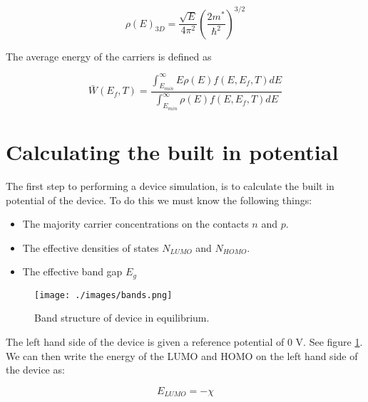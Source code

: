\begin{equation}
\rho(E)_{3D}=\frac{\sqrt{E}}{4\pi^2} \left ( \frac{2m^{*}}{\hbar^2}\right )^{3/2}
\end{equation}

The average energy of the carriers is defined as

\begin{equation}
\label{eq:energy}
\bar{W}(E_{f},T)=\frac{\int^{\infty}_{E_{min}} E \rho(E) f(E,E_{f},T) dE}{\int^{\infty}_{E_{min}} \rho(E) f(E,E_{f},T) dE}
\end{equation}












\section{Calculating the built in potential}  \label{sssec:initial}
The first step to performing a device simulation, is to calculate the built in potential of the device.  To do this we must know the following things:

\begin{itemize}

  \item The majority carrier concentrations on the contacts $n$ and $p$.
  \item The effective densities of states $N_{LUMO}$ and $N_{HOMO}$.
  \item The effective band gap $E_g$

\end{itemize}

\begin{figure}[H]
\centering
\texttt{[image: ./images/bands.png]}
\caption{Band structure of device in equilibrium.}
\label{fig:bands}
\end{figure}

\vspace{1em}
The left hand side of the device is given a reference potential of 0 V.  See figure \ref{fig:bands}.  We can then write the energy of the LUMO and HOMO on the left hand side of the device as:

\begin{equation}
E_{LUMO}=-\chi
\end{equation}

